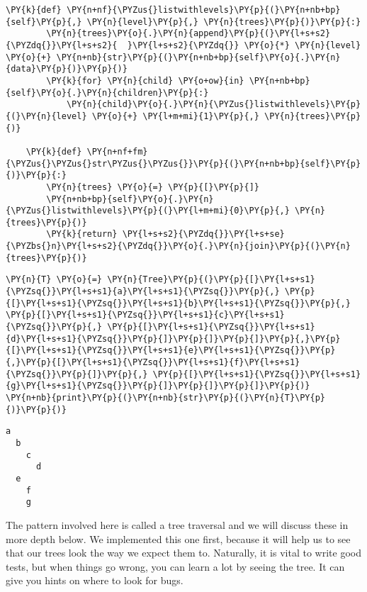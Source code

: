 \begin{Verbatim}[commandchars=\\\{\}]
    \PY{k}{def} \PY{n+nf}{\PYZus{}listwithlevels}\PY{p}{(}\PY{n+nb+bp}{self}\PY{p}{,} \PY{n}{level}\PY{p}{,} \PY{n}{trees}\PY{p}{)}\PY{p}{:}
        \PY{n}{trees}\PY{o}{.}\PY{n}{append}\PY{p}{(}\PY{l+s+s2}{\PYZdq{}}\PY{l+s+s2}{  }\PY{l+s+s2}{\PYZdq{}} \PY{o}{*} \PY{n}{level} \PY{o}{+} \PY{n+nb}{str}\PY{p}{(}\PY{n+nb+bp}{self}\PY{o}{.}\PY{n}{data}\PY{p}{)}\PY{p}{)}
        \PY{k}{for} \PY{n}{child} \PY{o+ow}{in} \PY{n+nb+bp}{self}\PY{o}{.}\PY{n}{children}\PY{p}{:}
            \PY{n}{child}\PY{o}{.}\PY{n}{\PYZus{}listwithlevels}\PY{p}{(}\PY{n}{level} \PY{o}{+} \PY{l+m+mi}{1}\PY{p}{,} \PY{n}{trees}\PY{p}{)}

    \PY{k}{def} \PY{n+nf+fm}{\PYZus{}\PYZus{}str\PYZus{}\PYZus{}}\PY{p}{(}\PY{n+nb+bp}{self}\PY{p}{)}\PY{p}{:}
        \PY{n}{trees} \PY{o}{=} \PY{p}{[}\PY{p}{]}
        \PY{n+nb+bp}{self}\PY{o}{.}\PY{n}{\PYZus{}listwithlevels}\PY{p}{(}\PY{l+m+mi}{0}\PY{p}{,} \PY{n}{trees}\PY{p}{)}
        \PY{k}{return} \PY{l+s+s2}{\PYZdq{}}\PY{l+s+se}{\PYZbs{}n}\PY{l+s+s2}{\PYZdq{}}\PY{o}{.}\PY{n}{join}\PY{p}{(}\PY{n}{trees}\PY{p}{)}
\end{Verbatim}



\begin{Verbatim}[commandchars=\\\{\}]
\PY{n}{T} \PY{o}{=} \PY{n}{Tree}\PY{p}{(}\PY{p}{[}\PY{l+s+s1}{\PYZsq{}}\PY{l+s+s1}{a}\PY{l+s+s1}{\PYZsq{}}\PY{p}{,} \PY{p}{[}\PY{l+s+s1}{\PYZsq{}}\PY{l+s+s1}{b}\PY{l+s+s1}{\PYZsq{}}\PY{p}{,} \PY{p}{[}\PY{l+s+s1}{\PYZsq{}}\PY{l+s+s1}{c}\PY{l+s+s1}{\PYZsq{}}\PY{p}{,} \PY{p}{[}\PY{l+s+s1}{\PYZsq{}}\PY{l+s+s1}{d}\PY{l+s+s1}{\PYZsq{}}\PY{p}{]}\PY{p}{]}\PY{p}{]}\PY{p}{,}\PY{p}{[}\PY{l+s+s1}{\PYZsq{}}\PY{l+s+s1}{e}\PY{l+s+s1}{\PYZsq{}}\PY{p}{,}\PY{p}{[}\PY{l+s+s1}{\PYZsq{}}\PY{l+s+s1}{f}\PY{l+s+s1}{\PYZsq{}}\PY{p}{]}\PY{p}{,} \PY{p}{[}\PY{l+s+s1}{\PYZsq{}}\PY{l+s+s1}{g}\PY{l+s+s1}{\PYZsq{}}\PY{p}{]}\PY{p}{]}\PY{p}{]}\PY{p}{)}
\PY{n+nb}{print}\PY{p}{(}\PY{n+nb}{str}\PY{p}{(}\PY{n}{T}\PY{p}{)}\PY{p}{)}
\end{Verbatim}

\begin{Verbatim}
a
  b
    c
      d
  e
    f
    g

\end{Verbatim}


The pattern involved here is called a tree traversal and we will discuss these in more depth below.
We implemented this one first, because it will help us to see that our trees look the way we expect them to.
Naturally, it is vital to write good tests, but when things go wrong, you can learn a lot by seeing the tree.
It can give you hints on where to look for bugs.


